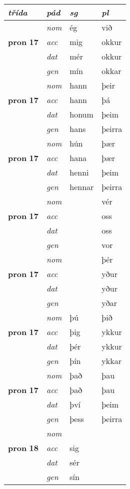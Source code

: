 \begin{longtable}{l>{\footnotesize\itshape}lll}
\toprule
 {\textbf{\textit{třída}}} & {\textit{pád}}   & \textit{sg} & \textit{pl}  \\
\midrule
\endhead
\multirow{3}{*}{{{\textbf{pron} \Large{\textbf{17}}}}}  &  nom & ég & við   \\*
 & acc &  mig  & okkur  \\*
 & dat & mér & okkur   \\*
 & gen & mín  & okkar  \\
\cmidrule{2-4}

\multirow{3}{*}{{{\textbf{pron} \Large{\textbf{17}}}}}  &  nom & hann & þeir   \\*
 & acc &  hann  & þá  \\*
 & dat & honum & þeim   \\*
 & gen & hans  & þeirra  \\
\cmidrule{2-4}

\multirow{3}{*}{{{\textbf{pron} \Large{\textbf{17}}}}}  &  nom & hún & þær   \\*
 & acc &  hana  & þær  \\*
 & dat & henni & þeim   \\*
 & gen & hennar  & þeirra  \\
\cmidrule{2-4}

\multirow{3}{*}{{{\textbf{pron} \Large{\textbf{17}}}}}  &  nom &  & vér   \\*
 & acc &    & oss  \\*
 & dat &  & oss   \\*
 & gen &   & vor  \\
\cmidrule{2-4}

\multirow{3}{*}{{{\textbf{pron} \Large{\textbf{17}}}}}  &  nom &  & þér   \\*
 & acc &    & yður  \\*
 & dat &  & yður   \\*
 & gen &   & yðar  \\
\cmidrule{2-4}

\multirow{3}{*}{{{\textbf{pron} \Large{\textbf{17}}}}}  &  nom & þú & þið   \\*
 & acc &  þig  & ykkur  \\*
 & dat & þér & ykkur   \\*
 & gen & þín  & ykkar  \\
\cmidrule{2-4}

\multirow{3}{*}{{{\textbf{pron} \Large{\textbf{17}}}}}  &  nom & það & þau   \\*
 & acc &  það  & þau  \\*
 & dat & því & þeim   \\*
 & gen & þess  & þeirra  \\
\cmidrule{2-4}

\multirow{3}{*}{{{\textbf{pron} \Large{\textbf{18}}}}}  &  nom &  &    \\*
 & acc &  sig  &   \\*
 & dat & sér &    \\*
 & gen & sín  &   \\
\bottomrule
\end{longtable}
